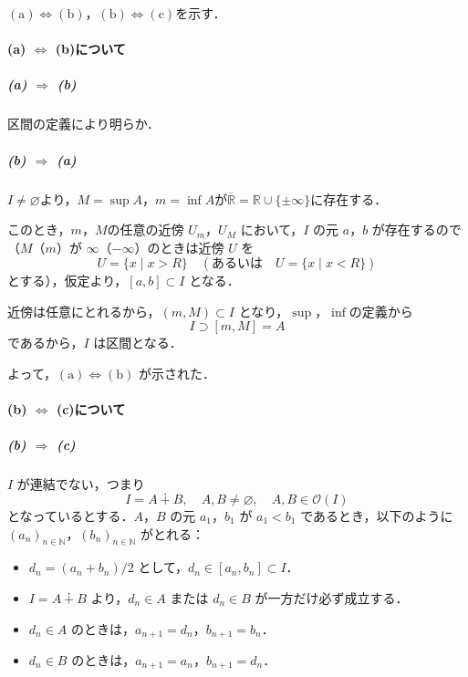 \begin{tproof}
    $(\text{a}) \iff (\text{b})$，$(\text{b}) \iff (\text{c})$を示す．

    \paragraph{(a) $\iff$ (b)について}

    \subparagraph{(a) $\Longrightarrow$ (b)}
    区間の定義により明らか．

    \subparagraph{(b) $\Longrightarrow$ (a)}
    $I \ne \varnothing$より，$M = \sup A$，$m = \inf A$が$\overline{\mathbb{R}}= \mathbb{R} \cup \{ \pm \infty \}$に存在する．

    このとき，$m$，$M$の任意の近傍 $U_m$，$U_M$ において，$I$ の元 $a$，$b$ が存在するので
    （$M$（$m$）が $\infty$（$-\infty$）のときは近傍 $U$ を
    \[
        U = \{ x \mid x > R\}\quad (\text{あるいは}\quad U = \{ x \mid x < R\})
    \]
    とする），仮定より，$[a,b] \subset I$ となる．

    近傍は任意にとれるから，$(m,M) \subset I$ となり，$\sup$，$\inf$の定義から
    \[
        I \supset [m,M] = A
    \]
    であるから，$I$ は区間となる．

    よって，$(\text{a}) \iff (\text{b})$ が示された．

    \paragraph{(b) $\iff$ (c)について}

    \subparagraph{(b) $\Longrightarrow$ (c)}
    $I$ が連結でない，つまり
    \[
        I = A \dotplus B,\quad A,B \ne \varnothing,\quad A , B \in \mathcal{O} (I)
    \]
    となっているとする．$A$，$B$ の元 $a_1$，$b_1$ が $a_1 < b_1$ であるとき，以下のように
    $(a_n)_{n \in \mathbb{N}}$，$(b_n)_{n \in \mathbb{N}}$ がとれる：

    \begin{itemize}
        \item $d_n = (a_n + b_n)/2$ として，$d_n \in [a_n,b_n] \subset I$．
        \item $I= A \dotplus B$ より，$d_n \in A$ または $d_n \in B$ が一方だけ必ず成立する．
        \item $d_n \in A$ のときは，$a_{n+1} = d_n$，$b_{n+1} = b_n$．
        \item $d_n \in B$ のときは，$a_{n+1} = a_n$，$b_{n+1} = d_n$．
    \end{itemize}


\end{tproof}
